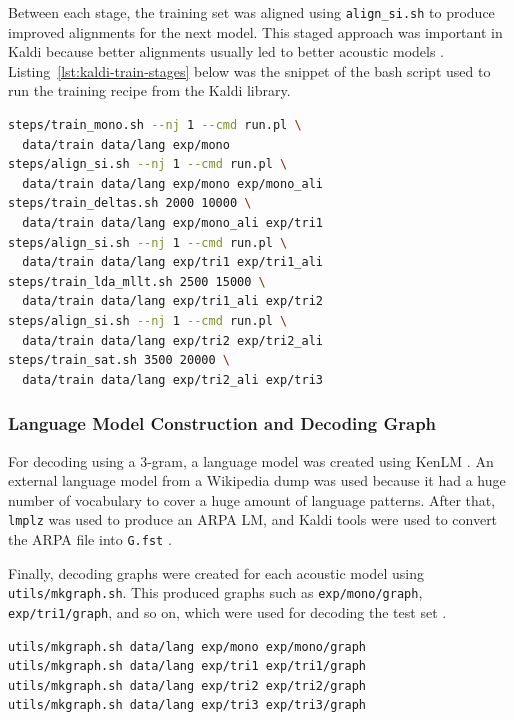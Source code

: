 Between each stage, the training set was aligned using \texttt{align\_si.sh} to produce improved alignments for the next model. This staged approach was important in Kaldi because better alignments usually led to better acoustic models \parencite{kaldi2011}. Listing~\ref{lst:kaldi-train-stages} below was the snippet of the bash script used to run the training recipe from the Kaldi library.

\begin{lstlisting}[language=Bash, caption={Acoustic model training stages}, label={lst:kaldi-train-stages}]
steps/train_mono.sh --nj 1 --cmd run.pl \
  data/train data/lang exp/mono 
steps/align_si.sh --nj 1 --cmd run.pl \
  data/train data/lang exp/mono exp/mono_ali 
steps/train_deltas.sh 2000 10000 \
  data/train data/lang exp/mono_ali exp/tri1 
steps/align_si.sh --nj 1 --cmd run.pl \
  data/train data/lang exp/tri1 exp/tri1_ali 
steps/train_lda_mllt.sh 2500 15000 \
  data/train data/lang exp/tri1_ali exp/tri2 
steps/align_si.sh --nj 1 --cmd run.pl \
  data/train data/lang exp/tri2 exp/tri2_ali 
steps/train_sat.sh 3500 20000 \
  data/train data/lang exp/tri2_ali exp/tri3                    
\end{lstlisting}

\subsubsection{Language Model Construction and Decoding Graph}
For decoding using a 3-gram, a language model was created using KenLM \parencite{kenlm}. An external language model from a Wikipedia dump was used because it had a huge number of vocabulary to cover a huge amount of language patterns. After that, \texttt{lmplz} was used to produce an ARPA LM, and Kaldi tools were used to convert the ARPA file into \texttt{G.fst} \parencite{kenlm, kaldi2011}.

Finally, decoding graphs were created for each acoustic model using \texttt{utils/mkgraph.sh}. This produced graphs such as \texttt{exp/mono/graph}, \texttt{exp/tri1/graph}, and so on, which were used for decoding the test set \parencite{kaldi2011}.

\begin{lstlisting}[language=Bash, caption={Decoding graph creation}, label={lst:kaldi-mkgraph}]
utils/mkgraph.sh data/lang exp/mono exp/mono/graph
utils/mkgraph.sh data/lang exp/tri1 exp/tri1/graph
utils/mkgraph.sh data/lang exp/tri2 exp/tri2/graph
utils/mkgraph.sh data/lang exp/tri3 exp/tri3/graph              
\end{lstlisting}

